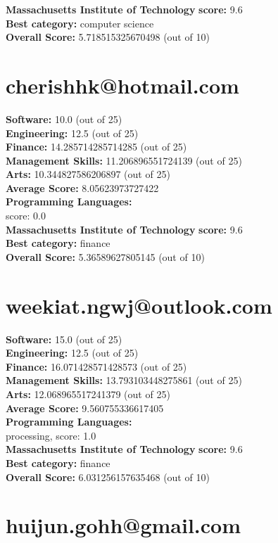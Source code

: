 \documentclass{article}
\begin{document}
\textbf{Massachusetts Institute of Technology} \textbf{score:} 9.6\\
\textbf{Best category: } computer science\\
\textbf{Overall Score: }5.718515325670498 (out of 10)\section{cherishhk@hotmail.com}
\textbf{Software:} 10.0 (out of 25)\\
\textbf{Engineering: } 12.5 (out of 25)\\
\textbf{Finance:} 14.285714285714285 (out of 25)\\
\textbf{Management Skills:} 11.206896551724139 (out of 25)\\
\textbf{Arts:} 10.344827586206897 (out of 25)\\
\textbf{Average Score: } 8.05623973727422\\
\textbf{Programming Languages:} \\
score: 0.0\\
\textbf{Massachusetts Institute of Technology} \textbf{score:} 9.6\\
\textbf{Best category: } finance\\
\textbf{Overall Score: }5.36589627805145 (out of 10)\section{weekiat.ngwj@outlook.com}
\textbf{Software:} 15.0 (out of 25)\\
\textbf{Engineering: } 12.5 (out of 25)\\
\textbf{Finance:} 16.071428571428573 (out of 25)\\
\textbf{Management Skills:} 13.793103448275861 (out of 25)\\
\textbf{Arts:} 12.068965517241379 (out of 25)\\
\textbf{Average Score: } 9.560755336617405\\
\textbf{Programming Languages:} \\
processing, score: 1.0\\
\textbf{Massachusetts Institute of Technology} \textbf{score:} 9.6\\
\textbf{Best category: } finance\\
\textbf{Overall Score: }6.031256157635468 (out of 10)\section{huijun.gohh@gmail.com}
\end{document}
